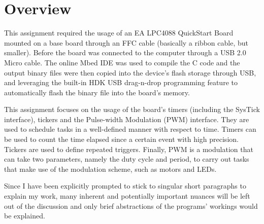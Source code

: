 \documentclass{article}
\begin{document}


\section*{Overview}
\justify
\large
This assignment required the usage of an EA LPC4088 QuickStart Board mounted on a base board through an FFC cable (basically a ribbon cable, but smaller). Before the board was connected to the computer through a USB 2.0 Micro cable. The online Mbed IDE was used to compile the C code and the output binary files were then copied into the device's flash storage through USB, and leveraging the built-in HDK USB drag-n-drop programming feature to automatically flash the binary file into the board's memory.

This assignment focuses on the usage of the board's timers (including the SysTick interface), tickers and the Pulse-width Modulation (PWM) interface. They are used to schedule tasks in a well-defined manner with respect to time. Timers can be used to count the time elapsed since a certain event with high precision. Tickers are used to define repeated triggers. Finally, PWM is a modulation that can take two parameters, namely the duty cycle and period, to carry out tasks that make use of the modulation scheme, such as motors and LEDs.

Since I have been explicitly prompted to stick to singular short paragraphs to explain my work, many inherent and potentially important nuances will be left out of the discussion and only brief abstractions of the programs' workings would be explained.\pagebreak
\end{document}
